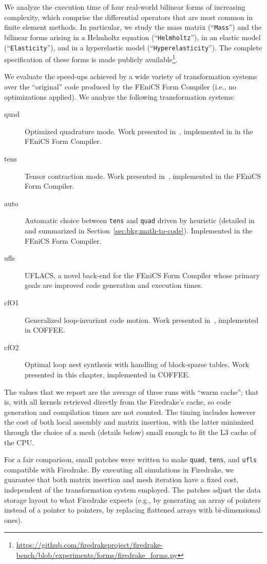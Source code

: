 We analyze the execution time of four real-world bilinear forms of increasing complexity, which comprise the differential operators that are most common in finite element methods. In particular, we study the mass matrix (``\texttt{Mass}'') and the bilinear forms arising in a Helmholtz equation (``\texttt{Helmholtz}''), in an elastic model (``\texttt{Elasticity}''), and in a hyperelastic model (``\texttt{Hyperelasticity}''). The complete specification of these forms is made publicly available\footnote{\url{https://github.com/firedrakeproject/firedrake-bench/blob/experiments/forms/firedrake_forms.py}}. 

We evaluate the speed-ups achieved by a wide variety of transformation systems over the ``original'' code produced by the FEniCS Form Compiler (i.e., no optimizations applied). We analyze the following transformation systems:
\begin{description}
\item[quad] Optimized quadrature mode. Work presented in~\cite{quadrature-olegaard}, implemented in  in the FEniCS Form Compiler. 
\item[tens] Tensor contraction mode. Work presented in~\cite{FFC-TC}, implemented in the FEniCS Form Compiler.
\item[auto] Automatic choice between \texttt{tens} and \texttt{quad} driven by heuristic (detailed in~\cite{Fenics} and summarized in Section~\ref{sec:bkg:math-to-code}). Implemented in the FEniCS Form Compiler.
\item[ufls] UFLACS, a novel back-end for the FEniCS Form Compiler whose primary goals are improved code generation and execution times.
\item[cfO1] Generalized loop-invariant code motion. Work presented in~\cite{Luporini-coffee}, implemented in COFFEE.
\item[cfO2] Optimal loop nest synthesis with handling of block-sparse tables. Work presented in this chapter, implemented in COFFEE.
\end{description}

The values that we report are the average of three runs with ``warm cache''; that is, with all kernels retrieved directly from the Firedrake's cache, so code generation and compilation times are not counted. The timing includes however the cost of both local assembly and matrix insertion, with the latter minimized through the choice of a mesh (details below) small enough to fit the L3 cache of the CPU. 

For a fair comparison, small patches were written to make \texttt{quad}, \texttt{tens}, and \texttt{ufls} compatible with Firedrake. By executing all simulations in Firedrake, we guarantee that both matrix insertion and mesh iteration have a fixed cost, independent of the transformation system employed. The patches adjust the data storage layout to what Firedrake expects (e.g., by generating an array of pointers instead of a pointer to pointers, by replacing flattened arrays with bi-dimensional ones). 

